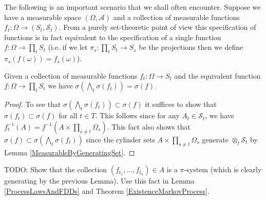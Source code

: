 The following is an important scenario that we shall often encounter.
Suppose we have a measurable space $(\Omega, \mathcal{A})$ and a
collection of measurable functions $f_t : \Omega \to (S_t,
\mathcal{S}_t)$.  From a purely set-theoretic point of view this
specification of functions is in fact
equivalent to the specification of a single function $f : \Omega \to
\prod_t S_t$ (i.e. if we let $\pi_s : \prod_t S_t \to S_s$ be the
projections then we define $\pi_s(f(\omega)) = f_s(\omega)$).  

\begin{lem}Given a collection of measurable functions $f_t : \Omega
  \to S_t$ and the equivalent function $f : \Omega \to \prod_t S_t$ we
  have $\sigma(\bigwedge_t \sigma(f_t)) = \sigma(f)$.
\end{lem}
\begin{proof}
To see that $\sigma(\bigwedge_t \sigma(f_t)) \subset \sigma(f)$ it
suffices to show that $\sigma(f_t) \subset \sigma(f)$ for all $t \in
T$.  This follows since for any $A_t \in \mathcal{S}_t$, we have
$f_t^{-1}(A) = f^{-1}(A \times  \prod_{s \neq t} \Omega_s)$.  This
fact also shows that $\sigma(f) \subset \sigma(\bigwedge_t
\sigma(f_t))$ since the cylinder sets $A \times  \prod_{s \neq t}
\Omega_s$ generate $\otimes_t \mathcal{S}_t$ by Lemma \ref{MeasurableByGeneratingSet}.
\end{proof}

TODO: Show that the collection $(f_{t_1}, \dotsc, f_{t_n}) \in A$ is a
$\pi$-system (which is clearly generating by the previous Lemma).  Use
this fact in Lemma \ref{ProcessLawsAndFDDs} and Theorem \ref{ExistenceMarkovProcess}.

